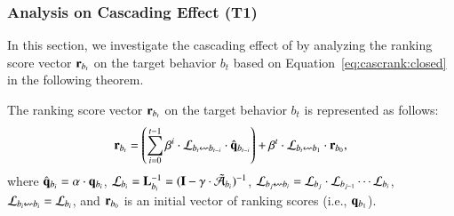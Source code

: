 \subsubsection{Analysis on Cascading Effect (T1)}
\label{sec:proposed:analysis:casc}
In this section, we investigate the cascading effect of \method by analyzing the ranking score vector $\mathbf{r}_{b_t}$ on the target behavior $b_t$ based on Equation~\eqref{eq:cascrank:closed} in the following theorem.

\begin{theorem} 
\label{theorem:decay}
The ranking score vector $\mathbf{r}_{b_t}$ on the target behavior $b_t$ is represented as follows:
\begin{align}
    \label{eq:casc_effect}
    \vect{r}_{b_t} = \left(\sum_{i=0}^{t-1}\beta^{i} \cdot \mat{\mathcal{L}}_{b_t \leftsquigarrow b_{t-i}} \cdot \hat{\vect{q}}_{b_{t-i}} \right) + \beta^{t}\cdot\mat{\mathcal{L}}_{b_t \leftsquigarrow b_1}\cdot\vect{r}_{b_0},
\end{align}
where $\hat{\mathbf{q}}_{b_i} = \alpha \cdot \mathbf{q}_{b_i}$, $\mathbf{\mathcal{L}}_{b_i} = \mathbf{L}_{b_i}^{-1} = (\mathbf{I} - \gamma \cdot \tilde{\mathbf{\mathcal{A}}}_{b_i})^{-1}$, $\mat{\mathcal{L}}_{b_j\leftsquigarrow b_i} = \mat{\mathcal{L}}_{b_j} \cdot \mat{\mathcal{L}}_{b_{j-1}}\cdots\mat{\mathcal{L}}_{b_i}$, 
$\Linvprod{i}{i} = \mat{\mathcal{L}}_{b_i}$,
and $\mathbf{r}_{b_0}$ is an initial vector of ranking scores (i.e., $\mathbf{q}_{b_1}$).
\end{theorem}
